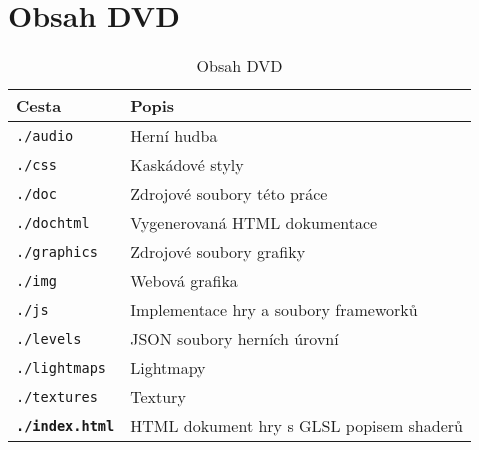 \chapter{Obsah DVD}
\begin{table}[!ht]
\label{table:dvd}
\begin{center}
\begin{tabular}{ | l | l |}
\hline
\textbf{Cesta} & \textbf{Popis} \\ \hline
\texttt{./audio} & Herní hudba \\ \hline
\texttt{./css} & Kaskádové styly \\ \hline
\texttt{./doc} & Zdrojové soubory této práce \\ \hline
\texttt{./dochtml} & Vygenerovaná HTML dokumentace \\ \hline
\texttt{./graphics} & Zdrojové soubory grafiky \\ \hline
\texttt{./img} & Webová grafika \\ \hline
\texttt{./js} & Implementace hry a soubory frameworků \\ \hline
\texttt{./levels} & JSON soubory herních úrovní \\ \hline
\texttt{./lightmaps} & Lightmapy \\ \hline
\texttt{./textures} & Textury \\ \hline
\textbf{\texttt{./index.html}} & HTML dokument hry s GLSL popisem shaderů \\ \hline
\end{tabular}
\end{center}
\caption{Obsah DVD}
\end{table}



